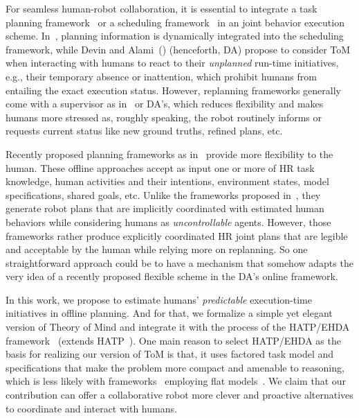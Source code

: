 \documentclass[letterpaper]{article} %
\begin{document}
For seamless human-robot collaboration, it is essential to integrate a task planning framework~\cite{lallement2018hatp} or a scheduling framework~\cite{ferreira2021scheduling} in an  joint behavior execution scheme. 
In~\cite{PupaS21}, planning information is dynamically integrated into the scheduling framework, while Devin and Alami~(\citeyear{devin2016implemented}) (henceforth, DA) propose to consider ToM when interacting with humans to react to their \textit{unplanned} run-time initiatives,
e.g., their temporary absence or inattention, which prohibit humans from entailing the exact execution status. 
However, replanning frameworks generally come with a supervisor as in~\cite{johannsmeier2016hierarchical} or DA's, which
reduces flexibility and makes humans more stressed as, roughly speaking, the robot routinely informs or requests current status like new ground truths, refined plans, etc.

Recently proposed planning frameworks as in~\cite{buisan:hal-03684211,UnhelkarLS19} provide more flexibility to the human. These offline approaches accept as input one or more of HR task knowledge, human activities and their intentions, environment states, model specifications, shared goals, etc. 
Unlike the frameworks proposed in~\cite{alami2006toward,lallement2018hatp,roncone2017transparent}, they generate robot plans that are implicitly coordinated with estimated human behaviors while considering humans as {\em uncontrollable} agents. 
However, those frameworks rather produce explicitly coordinated HR joint plans that are legible and acceptable by the human while relying more on replanning.
So one straightforward approach could be to have a mechanism that somehow adapts the very idea of a recently proposed flexible scheme in the DA's online framework. 

In this work, we propose to estimate humans' \textit{predictable} execution-time initiatives in offline planning. And for that, we formalize a simple yet elegant version of Theory of Mind and integrate it with the process of the HATP/EHDA framework~\cite{buisan:hal-03684211} (extends  HATP~\cite{lallement2018hatp,CirilloKS09}). 
One main reason to select HATP/EHDA as the basis for realizing our version of ToM is that, it uses factored task model and specifications that make the problem more compact and amenable to   reasoning, which is less likely with frameworks~\cite{unhelkar2019learning} employing flat models~\cite{levine2014concurrent,unhelkar2019learning}.
We claim that our contribution can offer a collaborative robot more clever and proactive alternatives to coordinate and interact with humans.
\end{document}
